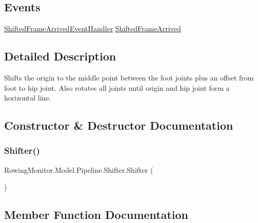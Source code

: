 \subsection*{Events}
\begin{DoxyCompactItemize}
\item 
\hyperlink{class_rowing_monitor_1_1_model_1_1_pipeline_1_1_shifter_a348927ce21661a1658060d083a91bd61}{Shifted\+Frame\+Arrived\+Event\+Handler} \hyperlink{class_rowing_monitor_1_1_model_1_1_pipeline_1_1_shifter_afd44d987e237cb912776101166c9f14f}{Shifted\+Frame\+Arrived}
\end{DoxyCompactItemize}


\subsection{Detailed Description}
Shifts the origin to the middle point between the foot joints plus an offset from foot to hip joint. Also rotates all joints until origin and hip joint form a horizontal line. 



\subsection{Constructor \& Destructor Documentation}
\mbox{\label{class_rowing_monitor_1_1_model_1_1_pipeline_1_1_shifter_a22e7862fcbc55f78166971743aba7a94}} 
\subsubsection{\texorpdfstring{Shifter()}{Shifter()}}
{\footnotesize\ttfamily Rowing\+Monitor.\+Model.\+Pipeline.\+Shifter.\+Shifter (\begin{DoxyParamCaption}{ }\end{DoxyParamCaption})}



\subsection{Member Function Documentation}
\mbox{\label{class_rowing_monitor_1_1_model_1_1_pipeline_1_1_shifter_ac48bc7448590a3926823feb882fa9042}} 
